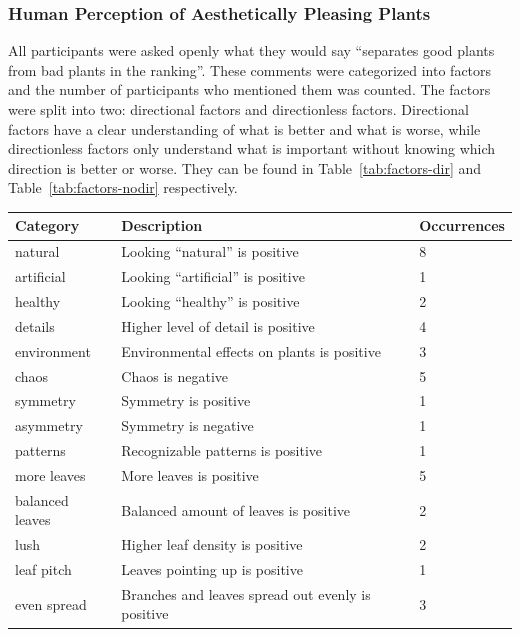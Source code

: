 \subsubsection{Human Perception of Aesthetically Pleasing Plants}
All participants were asked openly what they would say ``separates good plants from bad plants in the ranking''.
These comments were categorized into factors and the number of participants who mentioned them was counted.
The factors were split into two: directional factors and directionless factors.
Directional factors have a clear understanding of what is better and what is worse, while directionless factors only understand what is important without knowing which direction is better or worse.
They can be found in Table~\ref{tab:factors-dir} and Table~\ref{tab:factors-nodir} respectively.

\begin{table}
    \centering
    \begin{tabularx}{\textwidth}{| l | X | l |}
    \hline
    \textbf{Category} & \textbf{Description} & \textbf{Occurrences} \\
    \hline
    natural & Looking ``natural'' is positive & 8 \\
    \hline
    artificial & Looking ``artificial'' is positive & 1 \\
    \hline
    healthy & Looking ``healthy'' is positive & 2 \\
    \hline
    details & Higher level of detail is positive & 4 \\
    \hline
    environment & Environmental effects on plants is positive & 3 \\
    \hline
    chaos & Chaos is negative & 5 \\
    \hline
    symmetry & Symmetry is positive & 1 \\
    \hline
    asymmetry & Symmetry is negative & 1 \\
    \hline
    patterns & Recognizable patterns is positive & 1 \\
    \hline
    more leaves & More leaves is positive & 5 \\
    \hline
    balanced leaves & Balanced amount of leaves is positive & 2 \\
    \hline
    lush & Higher leaf density is positive & 2 \\
    \hline
    leaf pitch & Leaves pointing up is positive & 1 \\
    \hline
    even spread & Branches and leaves spread out evenly is positive & 3 \\

\end{tabularx}
\end{table}
